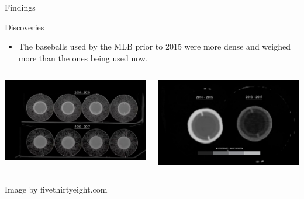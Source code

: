 \documentclass[14pt]{bredelebeamer}
\begin{document}
\begin{frame}{Findings}
\begin{block}{Discoveries}
\begin{itemize}
\item The baseballs used by the MLB prior to 2015 were more dense and weighed more than the ones being used now. 
\end{itemize}

\end{block}

\begin{columns}
\begin{column}{0.3\textwidth}
\includegraphics[scale = 0.07]{images/all_xray}
\end{column}
\begin{column}{0.4\textwidth}
\includegraphics[scale = 0.075]{images/density_balls}
\end{column}
\end{columns}
\centering
Image by fivethirtyeight.com

\end{frame}
\end{document}
